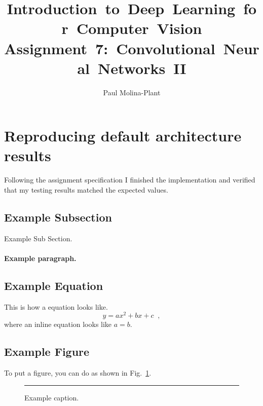 \documentclass[12pt, letter]{article}
\newcommand{\courseName}{Introduction~to~Deep~Learning~for~Computer~Vision}
\newcommand{\assignName}{Assignment~7:~Convolutional~Neural~Networks~II}
\begin{document}
\pagestyle{titlesec_assignment}

\title{\courseName\\\assignName}
\author{Paul Molina-Plant}

\maketitle


\section{Reproducing default architecture results}

Following the assignment specification I finished the implementation and
verified that my testing results matched the expected values.

\subsection{Example Subsection}

Example Sub Section. \lipsum[1]

\paragraph{Example paragraph.} \lipsum[1]


\subsection{Example  Equation}

This is how a equation looks like.
\begin{equation}
  y = a x^2 + b x + c
  \;\;,
\end{equation}
where an inline equation looks like $a=b$.

\subsection{Example  Figure}

To put a figure, you can do as shown in Fig.~\ref{fig:eg}.
\begin{figure}
  \centering
  \rule{2cm}{2cm} %
  \caption{Example caption.}
  \label{fig:eg}
\end{figure}
\end{document}
